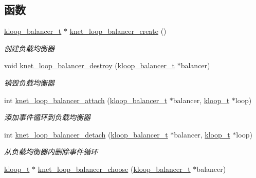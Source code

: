 \subsection*{函数}
\begin{DoxyCompactItemize}
\item 
\hyperlink{a00051_abd3f964265beb2f8984e76f44fb5ea33_abd3f964265beb2f8984e76f44fb5ea33}{kloop\+\_\+balancer\+\_\+t} $\ast$ \hyperlink{a00106_ga4211b2d32e1a7447e479b9727dce61d4_ga4211b2d32e1a7447e479b9727dce61d4}{knet\+\_\+loop\+\_\+balancer\+\_\+create} ()
\begin{DoxyCompactList}\small\item\em 创建负载均衡器 \end{DoxyCompactList}\item 
void \hyperlink{a00106_ga6fcdd378027b0705cd2e279601985609_ga6fcdd378027b0705cd2e279601985609}{knet\+\_\+loop\+\_\+balancer\+\_\+destroy} (\hyperlink{a00051_abd3f964265beb2f8984e76f44fb5ea33_abd3f964265beb2f8984e76f44fb5ea33}{kloop\+\_\+balancer\+\_\+t} $\ast$balancer)
\begin{DoxyCompactList}\small\item\em 销毁负载均衡器 \end{DoxyCompactList}\item 
int \hyperlink{a00106_ga647f8a2d39c97c8759f8768ebc612b98_ga647f8a2d39c97c8759f8768ebc612b98}{knet\+\_\+loop\+\_\+balancer\+\_\+attach} (\hyperlink{a00051_abd3f964265beb2f8984e76f44fb5ea33_abd3f964265beb2f8984e76f44fb5ea33}{kloop\+\_\+balancer\+\_\+t} $\ast$balancer, \hyperlink{a00051_a97fc76209a58362019f1ded9169e397f_a97fc76209a58362019f1ded9169e397f}{kloop\+\_\+t} $\ast$loop)
\begin{DoxyCompactList}\small\item\em 添加事件循环到负载均衡器 \end{DoxyCompactList}\item 
int \hyperlink{a00106_ga705fd81a537d18cfe1b66df9d15b6c4e_ga705fd81a537d18cfe1b66df9d15b6c4e}{knet\+\_\+loop\+\_\+balancer\+\_\+detach} (\hyperlink{a00051_abd3f964265beb2f8984e76f44fb5ea33_abd3f964265beb2f8984e76f44fb5ea33}{kloop\+\_\+balancer\+\_\+t} $\ast$balancer, \hyperlink{a00051_a97fc76209a58362019f1ded9169e397f_a97fc76209a58362019f1ded9169e397f}{kloop\+\_\+t} $\ast$loop)
\begin{DoxyCompactList}\small\item\em 从负载均衡器内删除事件循环 \end{DoxyCompactList}\item 
\hyperlink{a00051_a97fc76209a58362019f1ded9169e397f_a97fc76209a58362019f1ded9169e397f}{kloop\+\_\+t} $\ast$ \hyperlink{a00072_ab16d1483a612eba09677784480b5e1e7_ab16d1483a612eba09677784480b5e1e7}{knet\+\_\+loop\+\_\+balancer\+\_\+choose} (\hyperlink{a00051_abd3f964265beb2f8984e76f44fb5ea33_abd3f964265beb2f8984e76f44fb5ea33}{kloop\+\_\+balancer\+\_\+t} $\ast$balancer)

\end{DoxyCompactItemize}
